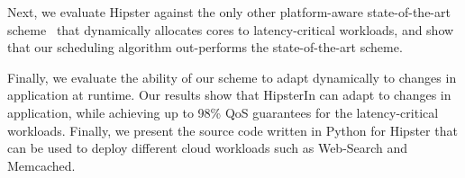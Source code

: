  Next, we evaluate  Hipster against the only other \het platform-aware
state-of-the-art scheme~\citep{Petrucci2015Octopus-Man:Computers} that dynamically
allocates \het cores to latency-critical workloads, and show that our scheduling algorithm
out-performs the state-of-the-art scheme.

 Finally, we evaluate the ability of our scheme to adapt dynamically to changes in
application at runtime. Our results show that HipsterIn can adapt to changes in
application, while achieving up to 98\% QoS guarantees for the latency-critical workloads.
Finally, we present the source code written in Python for Hipster that can be used to
deploy different cloud workloads such as Web-Search and Memcached.  

\fi






%
 


